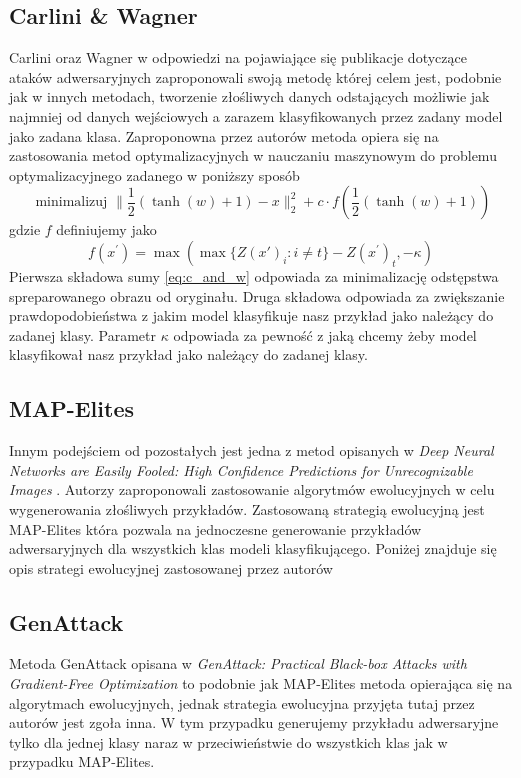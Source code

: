 \documentclass{article}
\begin{document}
\subsection{Carlini \& Wagner}
Carlini oraz Wagner\cite{DBLP:journals/corr/CarliniW16a} w odpowiedzi na pojawiające się publikacje dotyczące
ataków adwersaryjnych zaproponowali swoją metodę której celem jest, podobnie jak w innych metodach,
tworzenie złośliwych danych
odstających możliwie jak najmniej od danych wejściowych a zarazem klasyfikowanych przez zadany model jako
zadana klasa. Zaproponowna przez autorów metoda opiera się na zastosowania metod optymalizacyjnych  w nauczaniu
maszynowym do problemu optymalizacyjnego zadanego w poniższy sposób
\begin{equation}\label{eq:c_and_w}
    \text { minimalizuj } \| \frac { 1 } { 2 } ( \tanh ( w ) + 1 ) - x \| _ { 2 } ^ { 2 } + c \cdot f ( \frac { 1 } { 2 } ( \tanh ( w ) + 1 ) )
\end{equation}
gdzie $f$ definiujemy jako
\begin{equation}
    f ( x ^ { \prime } ) = \max ( \max \{ Z ( x' ) _ { i } : i \neq t \} - Z ( x ^ { \prime } ) _ { t } , - \kappa)
\end{equation}
Pierwsza składowa sumy \eqref{eq:c_and_w} odpowiada za minimalizację odstępstwa spreparowanego obrazu
od oryginału. Druga składowa odpowiada za zwiększanie prawdopodobieństwa z jakim model klasyfikuje nasz przykład
jako należący do zadanej klasy. Parametr \(\kappa\) odpowiada za pewność z jaką chcemy żeby model klasyfikował nasz
przykład jako należący do zadanej klasy.


\subsection{MAP-Elites}
Innym podejściem od pozostałych jest jedna z metod opisanych w
\textit{Deep Neural Networks are Easily Fooled: High Confidence Predictions for Unrecognizable Images} \cite{DBLP:journals/corr/NguyenYC14}.
Autorzy zaproponowali zastosowanie algorytmów ewolucyjnych w celu wygenerowania złośliwych przykładów.
Zastosowaną strategią ewolucyjną jest MAP-Elites która pozwala na jednoczesne generowanie przykładów adwersaryjnych dla
wszystkich klas modeli klasyfikującego. Poniżej znajduje się opis strategi ewolucyjnej zastosowanej przez autorów

\subsection{GenAttack}
Metoda GenAttack opisana w
\textit{GenAttack: Practical Black-box Attacks with Gradient-Free Optimization}\cite{DBLP:journals/corr/abs-1805-11090}
to podobnie jak MAP-Elites metoda opierająca się na algorytmach ewolucyjnych, jednak strategia ewolucyjna
przyjęta tutaj przez autorów jest zgoła inna. W tym przypadku generujemy przykładu adwersaryjne tylko dla jednej klasy naraz
w przeciwieństwie do wszystkich klas jak w przypadku MAP-Elites.
\end{document}

